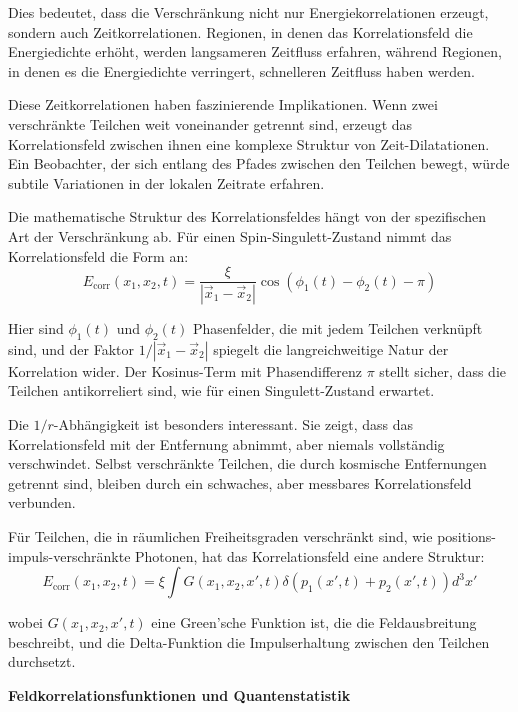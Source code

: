 \documentclass[12pt,a4paper]{article}
\newcommand{\xipar}{\xi}
\theoremstyle{definition}
\theoremstyle{remark}
\begin{document}
Dies bedeutet, dass die Verschränkung nicht nur Energiekorrelationen erzeugt, sondern auch Zeitkorrelationen. Regionen, in denen das Korrelationsfeld die Energiedichte erhöht, werden langsameren Zeitfluss erfahren, während Regionen, in denen es die Energiedichte verringert, schnelleren Zeitfluss haben werden.

Diese Zeitkorrelationen haben faszinierende Implikationen. Wenn zwei verschränkte Teilchen weit voneinander getrennt sind, erzeugt das Korrelationsfeld zwischen ihnen eine komplexe Struktur von Zeit-Dilatationen. Ein Beobachter, der sich entlang des Pfades zwischen den Teilchen bewegt, würde subtile Variationen in der lokalen Zeitrate erfahren.

Die mathematische Struktur des Korrelationsfeldes hängt von der spezifischen Art der Verschränkung ab. Für einen Spin-Singulett-Zustand nimmt das Korrelationsfeld die Form an:
\begin{equation}
	E_{\text{corr}}(x_1,x_2,t) = \frac{\xipar}{|\vec{x}_1 - \vec{x}_2|} \cos(\phi_1(t) - \phi_2(t) - \pi)
	\label{eq:singlet_correlation}
\end{equation}

Hier sind $\phi_1(t)$ und $\phi_2(t)$ Phasenfelder, die mit jedem Teilchen verknüpft sind, und der Faktor $1/|\vec{x}_1 - \vec{x}_2|$ spiegelt die langreichweitige Natur der Korrelation wider. Der Kosinus-Term mit Phasendifferenz $\pi$ stellt sicher, dass die Teilchen antikorreliert sind, wie für einen Singulett-Zustand erwartet.

Die $1/r$-Abhängigkeit ist besonders interessant. Sie zeigt, dass das Korrelationsfeld mit der Entfernung abnimmt, aber niemals vollständig verschwindet. Selbst verschränkte Teilchen, die durch kosmische Entfernungen getrennt sind, bleiben durch ein schwaches, aber messbares Korrelationsfeld verbunden.

Für Teilchen, die in räumlichen Freiheitsgraden verschränkt sind, wie positions-impuls-verschränkte Photonen, hat das Korrelationsfeld eine andere Struktur:
\begin{equation}
	E_{\text{corr}}(x_1,x_2,t) = \xipar \int G(x_1,x_2,x',t) \delta(p_1(x',t) + p_2(x',t)) d^3x'
	\label{eq:position_momentum_correlation}
\end{equation}

wobei $G(x_1,x_2,x',t)$ eine Green'sche Funktion ist, die die Feldausbreitung beschreibt, und die Delta-Funktion die Impulserhaltung zwischen den Teilchen durchsetzt.

\textbf{Feldkorrelationsfunktionen und Quantenstatistik}
\end{document}

